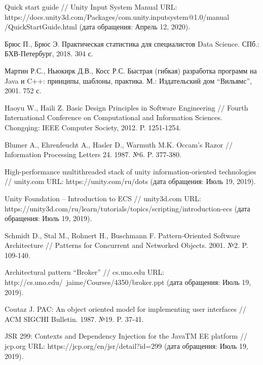 \begin{thebibliography}{9}
	 Quick start guide // Unity Input System Manual URL: https://docs.unity3d.com/Packages/com.unity.inputsystem@1.0/manual /QuickStartGuide.html (дата обращения: Апрель 12, 2020).
	
	 Брюс П., Брюс Э. Практическая статистика для специалистов Data Science. СПб.: БХВ-Петербург, 2018. 304 с.
	
	 Мартин Р.С., Ньюкирк Д.В., Косс Р.С. Быстрая (гибкая) разработка программ на Java и C++: принципы, шаблоны, практика. М.: Издательский дом ``Вильямс'', 2001. 752 с.

	 Haoyu W., Haili Z. Basic Design Principles in Software Engineering // Fourth International Conference on Computational and Information Sciences. Chongqing: IEEE Computer Society, 2012. P. 1251-1254.
	
	 Blumer A., Ehrenfeucht A., Hasler D., Warmuth M.K. Occam's Razor // Information Processing Letters 24. 1987. №6. P. 377-380.
	
	 High-performance multithreaded stack of unity information-oriented technologies // unity.com URL: https://unity.com/ru/dots (дата обращения: Июль 19, 2019).
	
	 Unity Foundation -- Introduction to ECS // unity3d.com URL: https://unity3d.com/ru/learn/tutorials/topics/scripting/introduction-ecs (дата обращения: Июль 19, 2019).
	
	 Schmidt D., Stal M., Rohnert H., Buschmann F. Pattern-Oriented Software Architecture // Patterns for Concurrent and Networked Objects. 2001. №2. P. 109-140.
	
	 Architectural pattern ``Broker'' // cs.uno.edu URL: http://cs.uno.edu/~jaime/Courses/4350/broker.ppt (дата обращения: Июль 19, 2019).
	
	 Coutaz J. PAC: An object oriented model for implementing user interfaces // ACM SIGCHI Bulletin. 1987. №19. P. 37-41.
	
	 JSR 299: Contexts and Dependency Injection for the JavaTM EE platform // jcp.org URL: https://jcp.org/en/jsr/detail?id=299 (дата обращения: Июль 19, 2019).
	
\end{thebibliography}